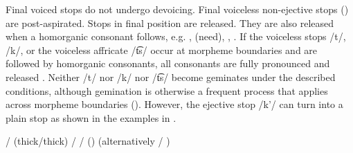 Final voiced stops do not undergo devoicing. Final voiceless non-ejective stops () are post-aspirated. Stops in final position are released. They are also released when a homorganic consonant follows, e.g.  ,   (need),  ,  . If the voiceless stops /t/, /k/, or the voiceless affricate /t͡s/ occur at morpheme boundaries and are followed by homorganic consonants, all consonants are fully pronounced and released . Neither /t/ nor /k/ nor /t͡s/ become geminates under the described conditions, although gemination is otherwise a frequent process that applies across morpheme boundaries (). However, the ejective stop /k’/ can turn into a plain stop as shown in the examples in .
%
\begin{exe}
	\ex	\label{ex:gemination A phon}
	\begin{xlist}
		\ex	{}\slash{}  (thick\slash{}thick)	\label{ex:bucce phon}
		\ex	{}\slash{} 	\label{ex:tuntce phon}
		\ex	{} /   () (alternatively  / )
	\end{xlist}
\end{exe}

